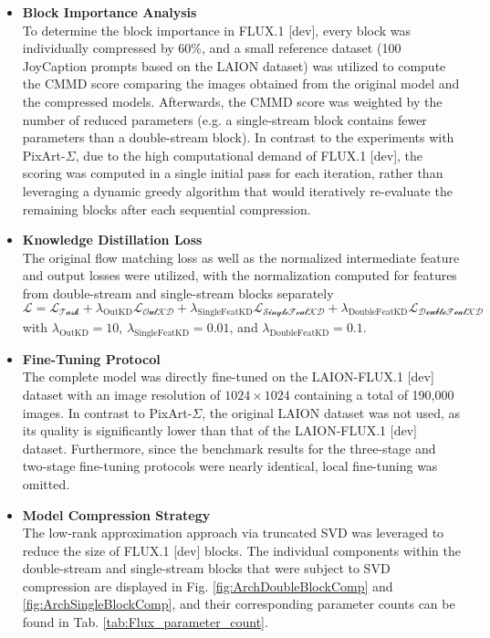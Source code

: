 \begin{itemize}
	\item \textbf{Block Importance Analysis} \\
	To determine the block importance in FLUX.1 {[dev]}, every block was individually compressed by 60\%, and a small reference dataset (100 JoyCaption prompts based on the LAION dataset) was utilized to compute the \gls{CMMD} score comparing the images obtained from the original model and the compressed models. Afterwards, the \gls{CMMD} score was weighted by the number of reduced parameters (e.g. a single-stream block contains fewer parameters than a double-stream block). In contrast to the experiments with PixArt-$\Sigma$, due to the high computational demand of FLUX.1 {[dev]}, the scoring was computed in a single initial pass for each iteration, rather than leveraging a dynamic greedy algorithm that would iteratively re-evaluate the remaining blocks after each sequential compression.
	
	\item \textbf{Knowledge Distillation Loss} \\
	The original flow matching loss as well as the normalized intermediate feature and output losses were utilized, with the normalization computed for features from double-stream and single-stream blocks separately
	\begin{equation}
		\mathcal{L} = \mathcal{L_\text{Task}} + \lambda_\text{OutKD} \mathcal{L_\text{OutKD}} + \lambda_\text{SingleFeatKD} \mathcal{L_\text{SingleFeatKD}} + \lambda_\text{DoubleFeatKD} \mathcal{L_\text{DoubleFeatKD}} 
	\end{equation}
	with $\lambda_\text{OutKD}  = 10$, $\lambda_\text{SingleFeatKD}=0.01$, and $\lambda_\text{DoubleFeatKD}=0.1$.
	
	\item \textbf{Fine-Tuning Protocol} \\
	The complete model was directly fine-tuned on the LAION-FLUX.1 {[dev]} dataset with an image resolution of $1024 \times 1024$ containing a total of 190,000 images. In contrast to PixArt-$\Sigma$, the original LAION dataset was not used, as its quality is significantly lower than that of the LAION-FLUX.1 {[dev]} dataset. Furthermore, since the benchmark results for the three-stage and two-stage fine-tuning protocols were nearly identical, local fine-tuning was omitted.
	
	\item \textbf{Model Compression Strategy} \\
	The low-rank approximation approach via truncated \gls{SVD} was leveraged to reduce the size of FLUX.1 {[dev]} blocks. The individual components within the double-stream and single-stream blocks that were subject to \gls{SVD} compression are displayed in Fig. \ref{fig:ArchDoubleBlockComp} and  \ref{fig:ArchSingleBlockComp}, and their corresponding parameter counts can be found in Tab. \ref{tab:Flux_parameter_count}.
	

\end{itemize}
